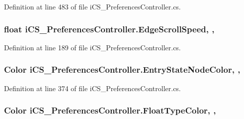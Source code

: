Definition at line 483 of file i\+C\+S\+\_\+\+Preferences\+Controller.\+cs.

\hypertarget{classi_c_s___preferences_controller_aa8132d06a33cbcb6e07e2054858bb260}{
\subsubsection[{Edge\+Scroll\+Speed}]{\setlength{\rightskip}{0pt plus 5cm}float i\+C\+S\+\_\+\+Preferences\+Controller.\+Edge\+Scroll\+Speed\hspace{0.3cm}{\ttfamily [static]}, {\ttfamily [get]}, {\ttfamily [set]}}}\label{classi_c_s___preferences_controller_aa8132d06a33cbcb6e07e2054858bb260}


Definition at line 189 of file i\+C\+S\+\_\+\+Preferences\+Controller.\+cs.

\hypertarget{classi_c_s___preferences_controller_a853ce5e52bae92b1b01cba8f373fbe35}{
\subsubsection[{Entry\+State\+Node\+Color}]{\setlength{\rightskip}{0pt plus 5cm}Color i\+C\+S\+\_\+\+Preferences\+Controller.\+Entry\+State\+Node\+Color\hspace{0.3cm}{\ttfamily [static]}, {\ttfamily [get]}, {\ttfamily [set]}}}\label{classi_c_s___preferences_controller_a853ce5e52bae92b1b01cba8f373fbe35}


Definition at line 374 of file i\+C\+S\+\_\+\+Preferences\+Controller.\+cs.

\hypertarget{classi_c_s___preferences_controller_aa58f6d445108cb3541ca604219f624ee}{
\subsubsection[{Float\+Type\+Color}]{\setlength{\rightskip}{0pt plus 5cm}Color i\+C\+S\+\_\+\+Preferences\+Controller.\+Float\+Type\+Color\hspace{0.3cm}{\ttfamily [static]}, {\ttfamily [get]}, {\ttfamily [set]}}}\label{classi_c_s___preferences_controller_aa58f6d445108cb3541ca604219f624ee}


